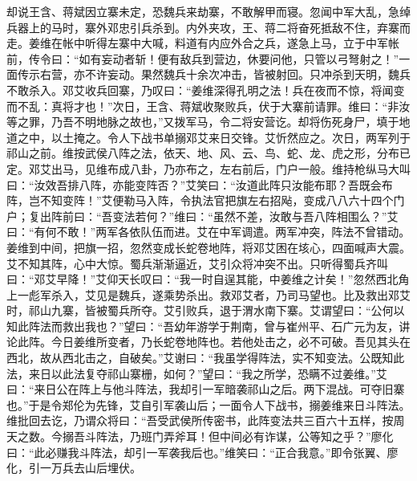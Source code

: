 却说王含、蒋斌因立寨未定，恐魏兵来劫寨，不敢解甲而寝。忽闻中军大乱，急绰兵器上的马时，寨外邓忠引兵杀到。内外夹攻，王、蒋二将奋死抵敌不住，弃寨而走。姜维在帐中听得左寨中大喊，料道有内应外合之兵，遂急上马，立于中军帐前，传令曰：“如有妄动者斩！便有敌兵到营边，休要问他，只管以弓弩射之！”一面传示右营，亦不许妄动。果然魏兵十余次冲击，皆被射回。只冲杀到天明，魏兵不敢杀入。邓艾收兵回寨，乃叹曰：“姜维深得孔明之法！兵在夜而不惊，将闻变而不乱：真将才也！”次日，王含、蒋斌收聚败兵，伏于大寨前请罪。维曰：“非汝等之罪，乃吾不明地脉之故也，”又拨军马，令二将安营讫。却将伤死身尸，填于地道之中，以土掩之。令人下战书单搦邓艾来日交锋。艾忻然应之。次日，两军列于祁山之前。维按武侯八阵之法，依天、地、风、云、鸟、蛇、龙、虎之形，分布已定。邓艾出马，见维布成八卦，乃亦布之，左右前后，门户一般。维持枪纵马大叫曰：“汝效吾排八阵，亦能变阵否？”艾笑曰：“汝道此阵只汝能布耶？吾既会布阵，岂不知变阵！”艾便勒马入阵，令执法官把旗左右招飐，变成八八六十四个门户；复出阵前曰：“吾变法若何？”维曰：“虽然不差，汝敢与吾八阵相围么？”艾曰：“有何不敢！”两军各依队伍而进。艾在中军调遣。两军冲突，阵法不曾错动。姜维到中间，把旗一招，忽然变成长蛇卷地阵，将邓艾困在垓心，四面喊声大震。艾不知其阵，心中大惊。蜀兵渐渐逼近，艾引众将冲突不出。只听得蜀兵齐叫曰：“邓艾早降！”艾仰天长叹曰：“我一时自逞其能，中姜维之计矣！”忽然西北角上一彪军杀入，艾见是魏兵，遂乘势杀出。救邓艾者，乃司马望也。比及救出邓艾时，祁山九寨，皆被蜀兵所夺。艾引败兵，退于渭水南下寨。艾谓望曰：“公何以知此阵法而救出我也？”望曰：“吾幼年游学于荆南，曾与崔州平、石广元为友，讲论此阵。今日姜维所变者，乃长蛇卷地阵也。若他处击之，必不可破。吾见其头在西北，故从西北击之，自破矣。”艾谢曰：“我虽学得阵法，实不知变法。公既知此法，来日以此法复夺祁山寨栅，如何？”望曰：“我之所学，恐瞒不过姜维。”艾曰：“来日公在阵上与他斗阵法，我却引一军暗袭祁山之后。两下混战。可夺旧寨也。”于是令郑伦为先锋，艾自引军袭山后；一面令人下战书，搦姜维来日斗阵法。维批回去讫，乃谓众将曰：“吾受武侯所传密书，此阵变法共三百六十五样，按周天之数。今搦吾斗阵法，乃班门弄斧耳！但中间必有诈谋，公等知之乎？”廖化曰：“此必赚我斗阵法，却引一军袭我后也。”维笑曰：“正合我意。”即令张翼、廖化，引一万兵去山后埋伏。

